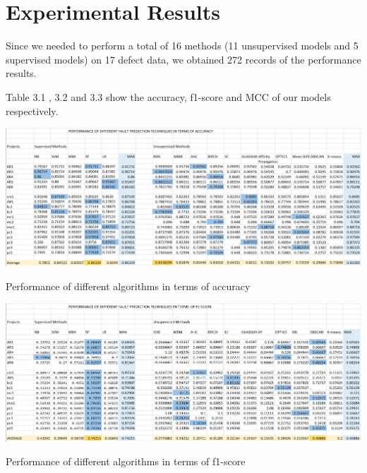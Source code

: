\chapter{Experimental Results}\label{final}

Since we needed to perform a total of 16 methods (11 unsupervised models and 5 supervised models) on 17 defect data, we obtained 272 records of the performance results.

\noindent Table 3.1 , 3.2 and 3.3 show the accuracy, f1-score and MCC of our models respectively. 

\begin{center}
 \includegraphics[scale=.6,keepaspectratio=true]{./accuracy}
\end{center}
\begin{table}[]
    \centering
    \caption{Performance of different algorithms in terms of accuracy}
    \label{tab:my_label}
\end{table}

\begin{center}
 \includegraphics[scale=.5,keepaspectratio=true]{./f1score}
\end{center}
\begin{table}[]
    \centering
    \caption{Performance of different algorithms in terms of f1-score}
    \label{tab:my_label}
\end{table}

